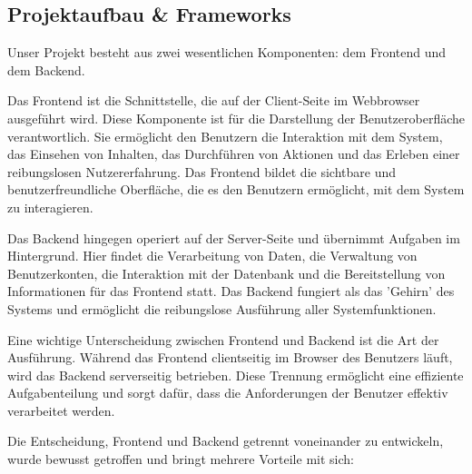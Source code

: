 \subsection{Projektaufbau \& Frameworks}

Unser Projekt besteht aus zwei wesentlichen Komponenten: dem Frontend und dem Backend.\newline

\noindent Das Frontend ist die Schnittstelle, die auf der Client-Seite im Webbrowser ausgeführt wird.
Diese Komponente ist für die Darstellung der Benutzeroberfläche verantwortlich. 
Sie ermöglicht den Benutzern die Interaktion mit dem System, das Einsehen von Inhalten, das 
Durchführen von Aktionen und das Erleben einer reibungslosen Nutzererfahrung. 
Das Frontend bildet die sichtbare und benutzerfreundliche Oberfläche, die es den Benutzern 
ermöglicht, mit dem System zu interagieren.\newline

\noindent Das Backend hingegen operiert auf der Server-Seite und übernimmt Aufgaben im Hintergrund. 
Hier findet die Verarbeitung von Daten, die Verwaltung von Benutzerkonten, die Interaktion mit der 
Datenbank und die Bereitstellung von Informationen für das Frontend statt. 
Das Backend fungiert als das 'Gehirn' des Systems und ermöglicht die reibungslose Ausführung 
aller Systemfunktionen.\newline

\noindent Eine wichtige Unterscheidung zwischen Frontend und Backend ist die Art der Ausführung. 
Während das Frontend clientseitig im Browser des Benutzers läuft, wird das Backend serverseitig 
betrieben. Diese Trennung ermöglicht eine effiziente Aufgabenteilung und sorgt dafür, 
dass die Anforderungen der Benutzer effektiv verarbeitet werden.\newline

\noindent Die Entscheidung, Frontend und Backend getrennt voneinander zu entwickeln, 
wurde bewusst getroffen und bringt mehrere Vorteile mit sich:


